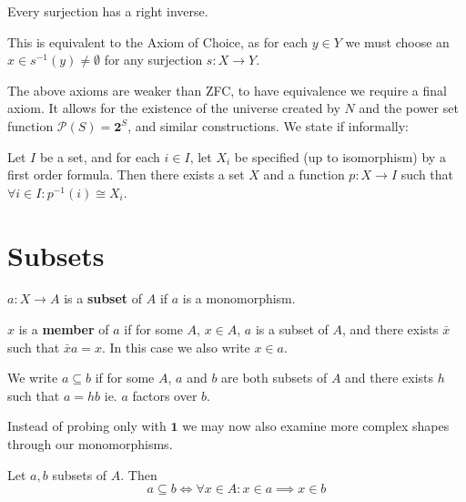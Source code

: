 \begin{axiom}[Choice]
Every surjection has a right inverse.
\end{axiom}

\begin{remark}
This is equivalent to the Axiom of Choice, as for each $y \in Y$ we must choose an $x \in s^{-1}(y) \neq \emptyset$ for any surjection $s: X \longrightarrow Y$.
\end{remark}

\begin{remark}
The above axioms are weaker than ZFC, to have equivalence we require a final axiom. It allows for the existence of the universe created by $N$ and the power set function $\mathcal{P}(S) = \mathbf{2}^S$, and similar constructions. We state if informally:
\end{remark}

\begin{axiom}[Replacement]
Let $I$ be a set, and for each $i \in I$, let $X_i$ be specified (up to isomorphism) by a first order formula. Then there exists a set $X$ and a function $p: X \longrightarrow I$ such that $\forall i \in I: p^{-1}(i) \cong X_i$. 
\end{axiom}

\section{Subsets}

\begin{definition}
$a:X \longrightarrow A$ is a \textbf{subset} of $A$ if $a$ is a monomorphism.

$x$ is a \textbf{member} of $a$ if for some $A$, $x \in A$, $a$ is a subset of $A$, and there exists $\bar{x}$ such that $\bar{x}a = x$. In this case we also write $x \in a$.

We write $a \subseteq b$ if for some $A$, $a$ and $b$ are both subsets of $A$ and there exists $h$ such that $a = hb$ ie. $a$ factors over $b$.
\end{definition}

\begin{remark}
Instead of probing only with $\mathbf{1}$ we may now also examine more complex shapes through our monomorphisms.
\end{remark}

\begin{theorem}
Let $a, b$ subsets of $A$. Then
\begin{equation}
a \subseteq b \iff \forall x \in A: x \in a \implies x \in b
\end{equation}
\end{theorem}

